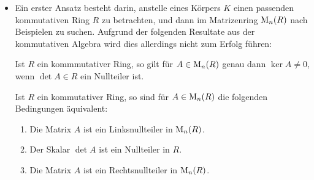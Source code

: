 \begin{itemize}
  \item
    Ein erster Ansatz besteht darin, anstelle eines Körpers $K$ einen passenden kommutativen Ring $R$ zu betrachten, und dann im Matrizenring $\operatorname{M}_{n}(R)$ nach Beispielen zu suchen.
    Aufgrund der folgenden Resultate aus der kommutativen Algebra wird dies allerdings nicht zum Erfolg führen:
    
    \begin{lemma}
      Ist $R$ ein kommmutativer Ring, so gilt für $A \in \operatorname{M}_{n}(R)$ genau dann $\ker A \neq 0$, wenn $\det A \in R$ ein Nullteiler ist.
    \end{lemma}

    \begin{corollary}
      Ist $R$ ein kommutativer Ring, so sind für $A \in \operatorname{M}_{n}(R)$ die folgenden Bedingungen äquivalent:
      \begin{enumerate}[leftmargin=*, label=\roman*)]
        \item
          Die Matrix $A$ ist ein Linksnullteiler in $\operatorname{M}_{n}(R)$.
        \item
          Der Skalar $\det A$ ist ein Nullteiler in $R$.
        \item
          Die Matrix $A$ ist ein Rechtsnullteiler in $\operatorname{M}_{n}(R)$.
      \end{enumerate}
    \end{corollary}
  

\end{itemize}
